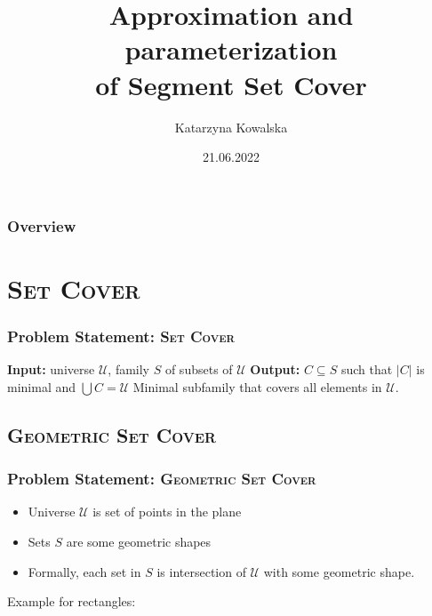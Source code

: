 \documentclass{beamer}
\title[Segment Set Cover]{Approximation and parameterization\\
of Segment Set Cover}
\author{Katarzyna Kowalska} %
\institute[MIMUW] %
{
University of Warsaw, MIMUW \\ %
\medskip
\textit{kk371053@students.mimuw.edu.pl} %
}
\date{21.06.2022} %
\begin{document}
\begin{frame}
\titlepage %
\end{frame}

\begin{frame}
\frametitle{Overview} %
\tableofcontents %
\end{frame}



\section{\textsc{Set Cover}}
\begin{frame}
\frametitle{Problem Statement: \textsc{Set Cover}}
\textbf{Input:} universe $\mathcal{U}$,
family $S$ of subsets of $\mathcal{U}$
\newline
\textbf{Output:} $C \subseteq S$ such that $|C|$ is minimal and
$\bigcup C = \mathcal{U}$
\newline
Minimal subfamily that covers all elements in $\mathcal{U}$.

\begin{center}

\end{center}

\end{frame}
\subsection{\textsc{Geometric Set Cover}}

\begin{frame}
\frametitle{Problem Statement: \textsc{Geometric Set Cover}}
\begin{itemize}
\item Universe $\mathcal{U}$ is set of points in the plane
\item Sets $S$ are some geometric shapes
\item Formally, each set in $S$ is intersection of $\mathcal{U}$
with some geometric shape.
\end{itemize}

Example for rectangles:




\end{frame}
\end{document}
